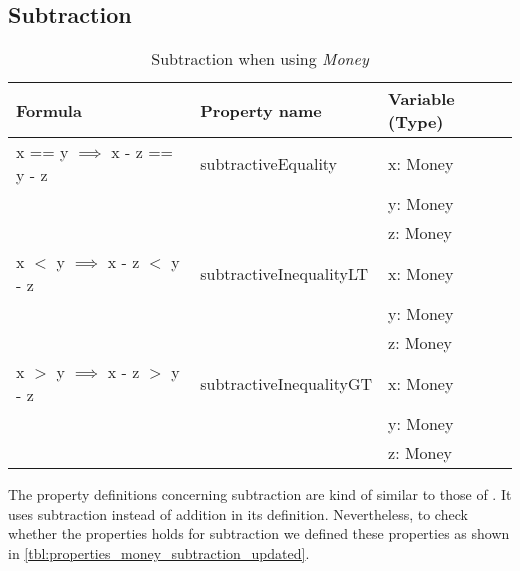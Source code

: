 \subsection*{Subtraction}
\label{ssct:properties_subtraction_updated}
\begin{table}[!ht]
\centering
\begin{tabular}{lll}
\hline
                        \textbf{Formula}                    & \textbf{Property name}  & \textbf{Variable (Type)} \\ \hline
\rowcolor[HTML]{EFEFEF} x == y $\implies$ x - z == y - z    & subtractiveEquality     & x: Money                 \\
\rowcolor[HTML]{EFEFEF}                                     &                         & y: Money                 \\
\rowcolor[HTML]{EFEFEF}                                     &                         & z: Money                 \\
                        x $<$ y $\implies$ x - z $<$ y - z  & subtractiveInequalityLT & x: Money                 \\
                                                            &                         & y: Money                 \\
                                                            &                         & z: Money                 \\
\rowcolor[HTML]{EFEFEF} x $>$ y $\implies$ x - z $>$ y - z  & subtractiveInequalityGT & x: Money                 \\
\rowcolor[HTML]{EFEFEF}                                     &                         & y: Money                 \\
\rowcolor[HTML]{EFEFEF}                                     &                         & z: Money                 \\ \hline
\end{tabular}
\caption{Subtraction when using \textit{Money}}
\label{tbl:properties_money_subtraction_updated}
\end{table}
\FloatBarrier
The property definitions concerning subtraction are kind of similar to those of
. It uses subtraction instead of
addition in its definition. Nevertheless, to check whether the properties holds
for subtraction we defined these properties as shown in
\autoref{tbl:properties_money_subtraction_updated}.


